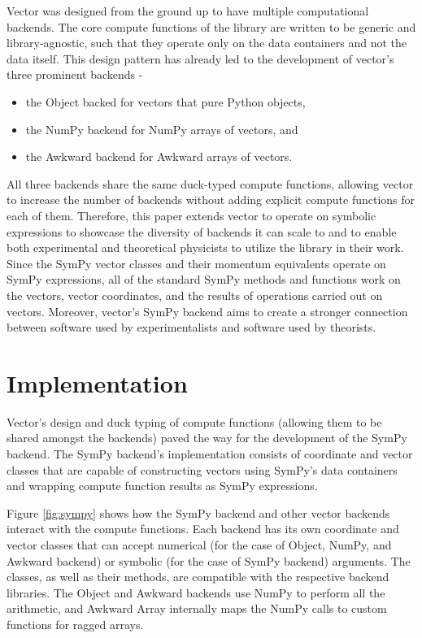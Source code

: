\documentclass{webofc}
\begin{document}
Vector was designed from the ground up to have multiple computational backends. The core compute functions of the library are written to be generic and library-agnostic, such that they operate only on the data containers and not the data itself. This design pattern has already led to the development of vector's three prominent backends -

\begin{itemize}
    \item the Object backed for vectors that pure Python objects,
    \item the NumPy backend for NumPy arrays of vectors, and
    \item the Awkward backend for Awkward arrays of vectors.
\end{itemize} 

All three backends share the same duck-typed compute functions, allowing vector to increase the number of backends without adding explicit compute functions for each of them. Therefore, this paper extends vector to operate on symbolic expressions to showcase the diversity of backends it can scale to and to enable both experimental and theoretical physicists to utilize the library in their work. Since the SymPy vector classes and their momentum equivalents operate on SymPy expressions, all of the standard SymPy methods and functions work on the vectors, vector coordinates, and the results of operations carried out on vectors. Moreover, vector’s SymPy backend aims to create a stronger connection between software used by experimentalists and software used by theorists.

\section{Implementation}
\label{sec-implementation}

Vector's design and duck typing of compute functions (allowing them to be shared amongst the backends) paved the way for the development of the SymPy backend. The SymPy backend's implementation consists of coordinate and vector classes that are capable of constructing vectors using SymPy's data containers and wrapping compute function results as SymPy expressions.

Figure \ref{fig:sympy} shows how the SymPy backend and other vector backends interact with the compute functions. Each backend has its own coordinate and vector classes that can accept numerical (for the case of Object, NumPy, and Awkward backend) or symbolic (for the case of SymPy backend) arguments. The classes, as well as their methods, are compatible with the respective backend libraries. The Object and Awkward backends use NumPy to perform all the arithmetic, and Awkward Array internally maps the NumPy calls to custom functions for ragged arrays.
\end{document}
